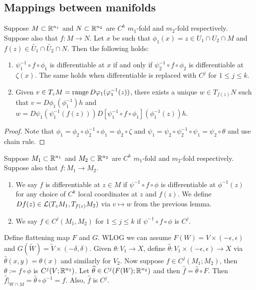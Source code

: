 \documentclass[a4paper]{article}
\newcommand{\TODO}{\textcolor{red}{\textbf{*** TO-DO ***}}}
\begin{document}
\subsection{Mappings between manifolds}

\fbox{\TODO: Add picture}

\begin{lemma}
Suppose $M \subset \mathbb{R}^{n_1}$ and $N \subset \mathbb{R}^{n_2}$ are 
$C^k$ $m_1$-fold and $m_2$-fold respectively. 
Suppose also that $f : M \to N$.
Let $x$ be such that $\phi_1(x) = z \in U_1 \cap U_2 \cap M$
and $f(z) \in \tilde{U_1} \cap \tilde{U_2} \cap N$.
Then the following holds: 
\begin{enumerate}
\item $\psi_1^{-1} \circ f \circ \phi_1$ is differentiable 
at $x$ if and only if $\psi_2^{-1} \circ f \circ \phi_2$
is differentiable at $\zeta(x)$.
The same holds when differentiable is replaced with 
$C^j$ for $1 \leq j \leq k$.

\item Given $v \in T_z M = \operatorname{range} D \varphi_1 (\varphi_1^{-1}(z))$, 
there exists a unique $w \in T_{f(z)} N$ such that 
$v = D \phi_1 (\phi_1^{-1}) h$ and 
$w = D \psi_1 (\psi_1^{-1} (f(z))) 
D [\psi_1^{-1} \circ f \circ \phi_1] (\phi_1^{-1}(z)) h$.
\end{enumerate}
\end{lemma}

\begin{proof}
Note that 
$\phi_1 = \phi_2 \circ \phi_2^{-1} \circ \phi_1 = \phi_2 \circ 
\zeta$ and $\psi_1 = \psi_2 \circ \psi_2^{-1} \circ \psi_1 
= \psi_2 \circ \theta$ and use chain rule.
\end{proof}

\begin{defi}
Suppose $M_1 \subset \mathbb{R}^{n_1}$ and $M_2 \subset \mathbb{R}^{n_2}$ are 
$C^k$ $m_1$-fold and $m_2$-fold respectively. 
Suppose also that $f : M_1 \to M_2$.

\begin{enumerate}
\item We say $f$ is differentiable at $z \in M$ 
if $\psi^{-1} \circ f \circ \phi$ is differentiable 
at $\phi^{-1}(z)$ for any choice of $C^k$ local coordinates
at $z$ and $f(z)$. We define 
$Df(z) \in \mathcal{L}(T_z M_1, T_{f(z)} M_2)$ via $v \mapsto w$ 
from the previous lemma.

\item We say $f \in C^j (M_1, M_2)$ for $1 \leq j \leq k$ 
if $\psi^{-1} \circ f \circ \phi$ is $C^j$.
\end{enumerate}
\end{defi}

Define flattening map $F$ and $G$. WLOG we can assume 
$F(W) = V \times (-\epsilon, \epsilon)$ and 
$G(\tilde{W}) = \tilde{V} \times (-\delta, \delta)$.
Given $\theta: V_1 \to X$, define $\hat{\theta} : 
V_1 \times (-\epsilon, \epsilon) \to X$ via 
$\hat{\theta}(x, y) = \theta(x)$ and similarly for $V_2$.
Now suppose $f \in C^j (M_1 ; M_2)$, then 
$\theta := f \circ \phi$ is $C^j(V; \mathbb{R}^{n_2})$.
Let $\widehat{\theta} \in C^j (F(W) ; \mathbb{R}^{n_2})$ 
and then $\hat{f} = \hat{\theta} \circ F$. 
Then $\hat{f} \vert_{W \cap M} = \hat{\theta} \circ\phi^{-1}
= f$. Also, $\hat{f}$ is $C^j$.
\end{document}
